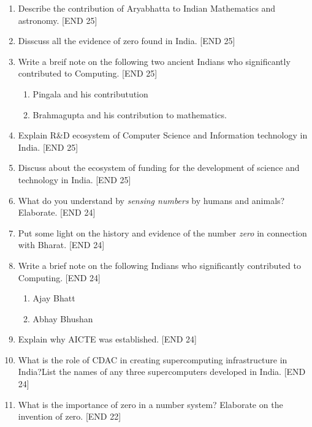 \documentclass[12pt]{article}
\begin{document}
\begin{enumerate}
			\item Describe the contribution of Aryabhatta to Indian Mathematics and astronomy. \hfill{[END 25]}
			
			\item Disscuss all the evidence of zero found in India. \hfill{[END 25]}
			
			\item Write a breif note on the following two ancient Indians who significantly contributed to Computing. \hfill{[END 25]}
			
			\begin{enumerate}
				\item Pingala and his contributution
				\item Brahmagupta and his contribution to mathematics.
			\end{enumerate}
			
			\item Explain R\&D ecosystem of Computer Science and Information technology in India. \hfill{[END 25]}
			
			\item Discuss about the ecosystem of funding for the development of science and technology in India. \hfill{[END 25]}
			
			\item What do you understand by \textit{sensing numbers} by humans and animals?Elaborate. \hfill{[END 24]}
			
			\item Put some light on the history and evidence of the number \textit{zero} in connection with Bharat. \hfill{[END 24]}
			
			\item Write a brief note on the following Indians who significantly contributed to Computing. \hfil{[END 24]}
			
			\begin{enumerate}
				\item Ajay Bhatt
				\item Abhay Bhushan
			\end{enumerate}
			
			\item Explain why AICTE was established. \hfill{[END 24]}
			
			\item What is the role of CDAC in creating supercomputing infrastructure in India?List the names of any three supercomputers developed in India. \hfill{[END 24]}
			
			\item What is the importance of zero in a number system? Elaborate on the invention of zero. \hfill{[END 22]}
			

\end{enumerate}
\end{document}
